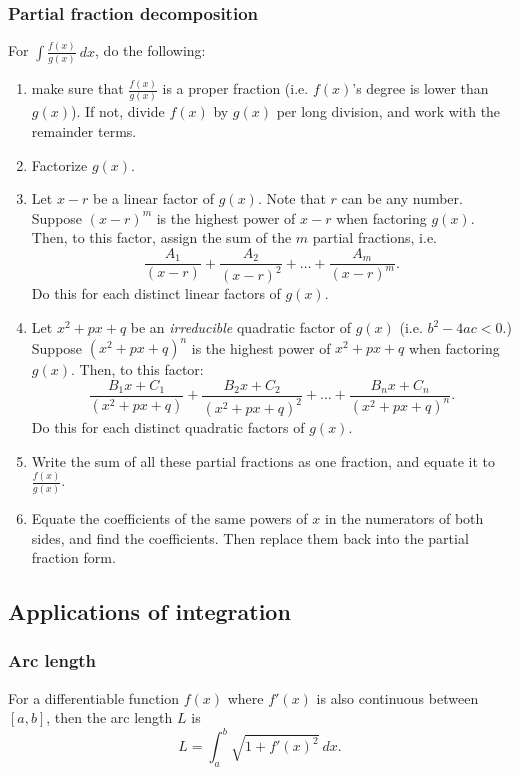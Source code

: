 \documentclass[main.tex]{subfiles}
\begin{document}
	\subsubsection*{Partial fraction decomposition}
	For \(\int \frac{f(x)}{g(x)} \ dx\), do the following:
	\begin{enumerate}
		\item make sure that \(\frac{f(x)}{g(x)}\) is a proper fraction (i.e. \(f(x)\)'s degree is lower than \(g(x)\)). If not, divide \(f(x)\) by \(g(x)\) per long division, and work with the remainder terms.
		\item Factorize \(g(x)\).
		\item Let \(x - r\) be a linear factor of \(g(x)\). Note that \(r\) can be any number. Suppose \((x - r)^m\) is the highest power of \(x - r\) when factoring \(g(x)\). Then, to this factor, assign the sum of the \(m\) partial fractions, i.e. 
		\[\frac{A_1}{(x - r)} + \frac{A_2}{(x - r)^2} + \dots + \frac{A_m}{(x - r)^m}.\] 
		Do this for each distinct linear factors of \(g(x)\).
		\item Let \(x^2 + px + q\) be an \emph{irreducible} quadratic factor of \(g(x)\) (i.e. \(b^2 - 4ac < 0\).) Suppose \((x^2 + px + q)^n\) is the highest power of \(x^2 + px + q\) when factoring \(g(x)\). Then, to this factor: 
		\[\frac{B_1x + C_1}{(x^2 + px + q)} + \frac{B_2x + C_2}{(x^2 + px + q)^2} + \dots + \frac{B_n x + C_n}{(x^2 + px + q)^n}.\]
		Do this for each distinct quadratic factors of \(g(x)\).
		\item Write the sum of all these partial fractions as one fraction, and equate it to \(\frac{f(x)}{g(x)}\).
		\item Equate the coefficients of the same powers of \(x\) in the numerators of both sides, and find the coefficients. Then replace them back into the partial fraction form.
	\end{enumerate}

	\subsection*{Applications of integration}

	\subsubsection*{Arc length}
	For a differentiable function \(f(x)\) where \(f'(x)\) is also continuous between \([a, b]\), then the arc length \(L\) is \[L = \int_a^b \sqrt{1 + f'(x)^2} \ dx.\]
\end{document}
